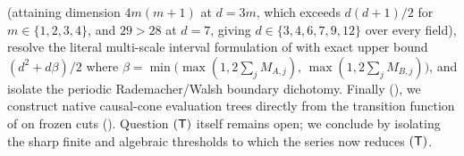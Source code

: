 \cite[Remark~5.6]{SeventeenthPaper2026} (attaining dimension $4m(m+1)$ at $d = 3m$, which exceeds
$d(d+1)/2$ for $m \in \{1,2,3,4\}$, and $29 > 28$ at $d = 7$, giving $d \in \{3,4,6,7,9,12\}$ over
every field), resolve the literal multi-scale interval formulation of
\cite[Problem~9.3]{SeventeenthPaper2026} with exact upper bound $(d^2 + d\beta)/2$ where
$\beta = \min\bigl(\max(1, 2\sum_j M_{A,j}),\, \max(1, 2\sum_j M_{B,j})\bigr)$,
and isolate the periodic Rademacher/Walsh boundary dichotomy. Finally
(), we construct native causal-cone
evaluation trees directly from the transition function of  on frozen
cuts (\cite[Problem~9.4]{SeventeenthPaper2026}). Question $(\mathsf{T})$ itself remains open; we
conclude by isolating the sharp finite and algebraic thresholds to which the series now
reduces $(\mathsf{T})$.
